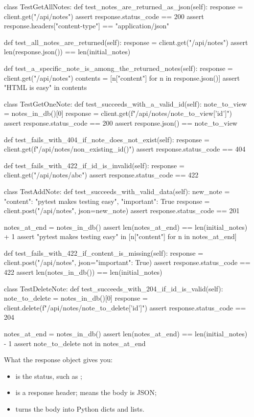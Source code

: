 \begin{py}
class TestGetAllNotes:
	def test_notes_are_returned_as_json(self):
		response = client.get("/api/notes")
		assert response.status_code == 200
		assert response.headers["content-type"] == "application/json"

	def test_all_notes_are_returned(self):
		response = client.get("/api/notes")
		assert len(response.json()) == len(initial_notes)

	def test_a_specific_note_is_among_the_returned_notes(self):
		response = client.get("/api/notes")
		contents = [n["content"] for n in response.json()]
		assert "HTML is easy" in contents


class TestGetOneNote:
	def test_succeeds_with_a_valid_id(self):
		note_to_view = notes_in_db()[0]
		response = client.get(f"/api/notes/{note_to_view['id']}")
		assert response.status_code == 200
		assert response.json() == note_to_view

	def test_fails_with_404_if_note_does_not_exist(self):
		response = client.get(f"/api/notes/{non_existing_id()}")
		assert response.status_code == 404

	def test_fails_with_422_if_id_is_invalid(self):
		response = client.get("/api/notes/abc")
		assert response.status_code == 422


class TestAddNote:
	def test_succeeds_with_valid_data(self):
		new_note = {"content": "pytest makes testing easy", "important": True}
		response = client.post("/api/notes", json=new_note)
		assert response.status_code == 201

		notes_at_end = notes_in_db()
		assert len(notes_at_end) == len(initial_notes) + 1
		assert "pytest makes testing easy" in [n["content"] for n in notes_at_end]

	def test_fails_with_422_if_content_is_missing(self):
		response = client.post("/api/notes", json={"important": True})
		assert response.status_code == 422
		assert len(notes_in_db()) == len(initial_notes)


class TestDeleteNote:
	def test_succeeds_with_204_if_id_is_valid(self):
		note_to_delete = notes_in_db()[0]
		response = client.delete(f"/api/notes/{note_to_delete['id']}")
		assert response.status_code == 204

		notes_at_end = notes_in_db()
		assert len(notes_at_end) == len(initial_notes) - 1
		assert note_to_delete not in notes_at_end
\end{py}

What the response object gives you:
\begin{itemize}
\item {} is the status, such as ;
\item {} is a response header;  means the body is JSON;
\item {} turns the body into Python dicts and lists.
\end{itemize}


